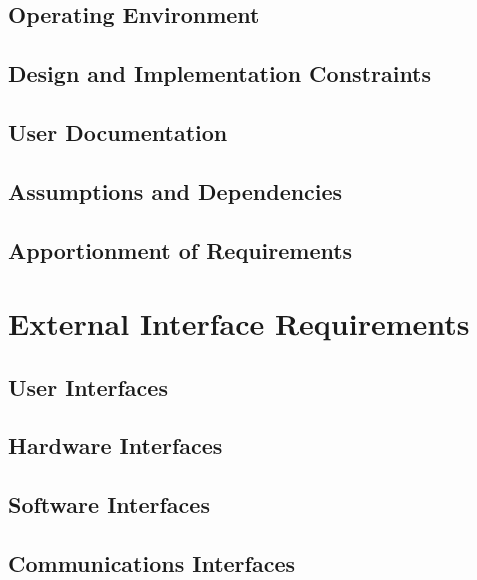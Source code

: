 \documentclass[11pt]{article}
\begin{document}
\subsection{Operating Environment}
\label{sec:environment}

\subsection{Design and Implementation Constraints}
\label{sec:constraints}

\subsection{User Documentation}
\label{sec:documentation}

\subsection{Assumptions and Dependencies}
\label{sec:assumptions}

\subsection{Apportionment of Requirements}
\label{sec:apportionment}

\newpage %
\section{External Interface Requirements}
\label{sec:external}

\subsection{User Interfaces}
\label{sec:user}

\subsection{Hardware Interfaces}
\label{sec:hardware}

\subsection{Software Interfaces}
\label{sec:software}

\subsection{Communications Interfaces}
\label{sec:communications}
\end{document}
